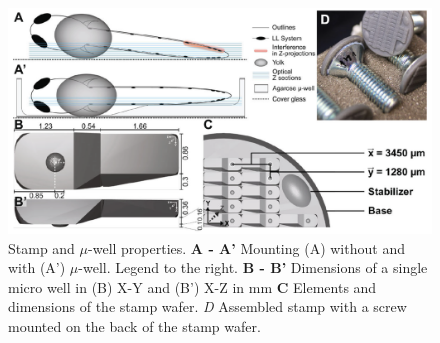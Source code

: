 \documentclass[10pt, b5paper, singlespacinge, twoside]{reedthesis} %
\theoremstyle{definition}
\theoremstyle{definition}
\theoremstyle{definition}
\theoremstyle{remark}
\begin{document}
\begin{figure}

{\centering \includegraphics[width=0.95\linewidth]{figures/results/00_methods/mounting/stamp_dims} 

}

\caption[Stamp and micro-well properties]{Stamp and \(\mu\)-well properties. \textbf{A - A'} Mounting (A) without and with (A') \(\mu\)-well. Legend to the right. \textbf{B - B'} Dimensions of a single micro well in (B) X-Y and (B') X-Z in mm \textbf{C} Elements and dimensions of the stamp wafer. \emph{D} Assembled stamp with a screw mounted on the back of the stamp wafer.}\label{fig:mountmicro}
\end{figure}
\end{document}
